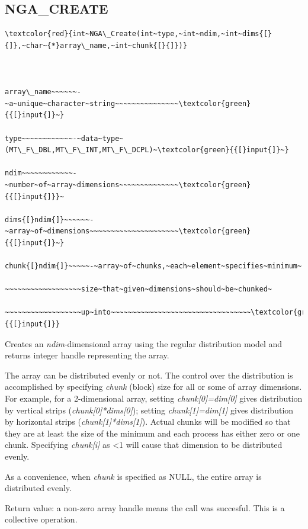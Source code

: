 \subsection*{\label{sub:NGA_CREATE}NGA\_CREATE}
\begin{verbatim}
\textcolor{red}{int~NGA\_Create(int~type,~int~ndim,~int~dims{[}{]},~char~{*}array\_name,~int~chunk{[}{]})}



array\_name~~~~~~-~a~unique~character~string~~~~~~~~~~~~~~~\textcolor{green}{{[}input{]}~}

type~~~~~~~~~~~~-~data~type~(MT\_F\_DBL,MT\_F\_INT,MT\_F\_DCPL)~\textcolor{green}{{[}input{]}~}

ndim~~~~~~~~~~~~-~number~of~array~dimensions~~~~~~~~~~~~~~\textcolor{green}{{[}input{]}}~

dims{[}ndim{]}~~~~~~-~array~of~dimensions~~~~~~~~~~~~~~~~~~~~~\textcolor{green}{{[}input{]}~}

chunk{[}ndim{]}~~~~~-~array~of~chunks,~each~element~specifies~minimum~

~~~~~~~~~~~~~~~~~~size~that~given~dimensions~should~be~chunked~

~~~~~~~~~~~~~~~~~~up~into~~~~~~~~~~~~~~~~~~~~~~~~~~~~~~~~~\textcolor{green}{{[}input{]}}
\end{verbatim}
Creates an \emph{ndim}-dimensional array using the regular distribution
model and returns integer handle representing the array.

The array can be distributed evenly or not. The control over the distribution
is accomplished by specifying \emph{chunk} (block) size for all or
some of array dimensions. For example, for a 2-dimensional array,
setting \emph{chunk{[}0{]}=dim{[}0{]}} gives distribution by vertical
strips (\emph{chunk{[}0{]}{*}dims{[}0{]}}); setting \emph{chunk{[}1{]}=dim{[}1{]}}
gives distribution by horizontal strips (\emph{chunk{[}1{]}{*}dims{[}1{]}}).
Actual chunks will be modified so that they are at least the size
of the minimum and each process has either zero or one chunk. Specifying
\emph{chunk{[}i{]} }as <1 will cause that dimension to be distributed
evenly.

As a convenience, when \emph{chunk} is specified as NULL, the entire
array is distributed evenly.

Return value: a non-zero array handle means the call was succesful.
This is a collective operation.


